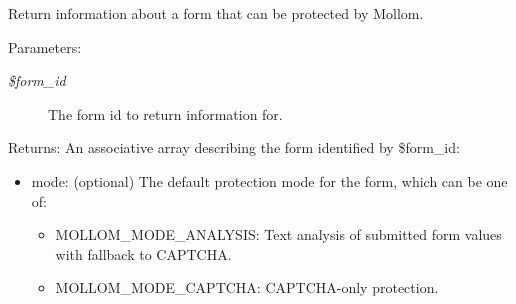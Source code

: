 Return information about a form that can be protected by Mollom.

\begin{Desc}
\item[Parameters:]
\begin{description}
\item[{\em \$form\_\-id}]The form id to return information for.\end{description}
\end{Desc}
\begin{Desc}
\item[Returns:]An associative array describing the form identified by \$form\_\-id:\begin{itemize}
\item mode: (optional) The default protection mode for the form, which can be one of:\begin{itemize}
\item MOLLOM\_\-MODE\_\-ANALYSIS: Text analysis of submitted form values with fallback to CAPTCHA.\item MOLLOM\_\-MODE\_\-CAPTCHA: CAPTCHA-only protection.\end{itemize}

\end{itemize}
\end{Desc}
